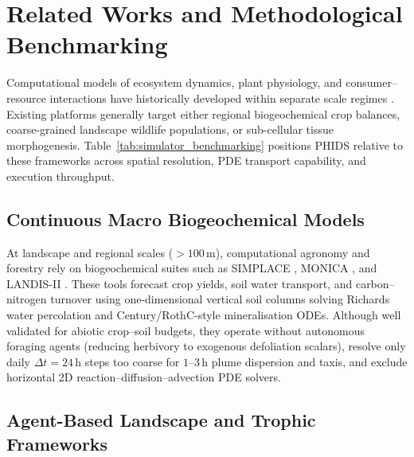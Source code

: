 
\section{Related Works and Methodological Benchmarking}
\label{sec:related_works}

Computational models of ecosystem dynamics, plant physiology, and consumer--resource interactions have historically developed within separate scale regimes \cite{okubo2001diffusion, swat2012multiscale}. Existing platforms generally target either regional biogeochemical crop balances, coarse-grained landscape wildlife populations, or sub-cellular tissue morphogenesis. Table~\ref{tab:simulator_benchmarking} positions PHIDS relative to these frameworks across spatial resolution, PDE transport capability, and execution throughput.

\subsection{Continuous Macro Biogeochemical Models}
\label{sec:related_biogeochem}

At landscape and regional scales ($> 100\,\text{m}$), computational agronomy and forestry rely on biogeochemical suites such as SIMPLACE \cite{enders2023simplace}, MONICA \cite{nendel2011monica}, and LANDIS-II \cite{scheller2007landis}. These tools forecast crop yields, soil water transport, and carbon--nitrogen turnover using one-dimensional vertical soil columns solving Richards water percolation and Century/RothC-style mineralisation ODEs. Although well validated for abiotic crop--soil budgets, they operate without autonomous foraging agents (reducing herbivory to exogenous defoliation scalars), resolve only daily $\Delta t = 24\,\text{h}$ steps too coarse for $1\text{--}3\,\text{h}$ plume dispersion and taxis, and exclude horizontal 2D reaction--diffusion--advection PDE solvers.

\subsection{Agent-Based Landscape and Trophic Frameworks}
\label{sec:related_abm}

